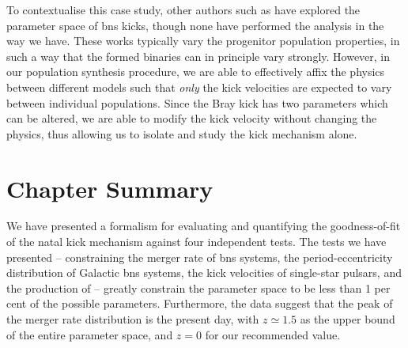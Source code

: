 To contextualise this case study, other authors such as \citet{Mapelli:2018, Wiktorowicz:2019, Giacobbo:2020, Santoliquido:2021, Kapil:2023} have explored the parameter space of \gls{bns} kicks, though none have performed the analysis in the way we have. These works typically vary the progenitor population properties, in such a way that the formed binaries can in principle vary strongly. However, in our population synthesis procedure, we are able to effectively affix the physics between different models such that \textit{only} the kick velocities are expected to vary between individual populations. Since the Bray kick has two parameters which can be altered, we are able to modify the kick velocity without changing the physics, thus allowing us to isolate and study the kick mechanism alone.

\section{Chapter Summary}

We have presented a formalism for evaluating and quantifying the goodness-of-fit of the natal kick mechanism against four independent tests. The tests we have presented -- constraining the merger rate of \gls{bns} systems, the period-eccentricity distribution of Galactic \gls{bns} systems, the kick velocities of single-star pulsars, and the production of  -- greatly constrain the parameter space to be less than 1 per cent of the possible parameters. Furthermore, the data suggest that the peak of the merger rate distribution is the present day, with $z\simeq 1.5$ as the upper bound of the entire parameter space, and $z=0$ for our recommended value.

